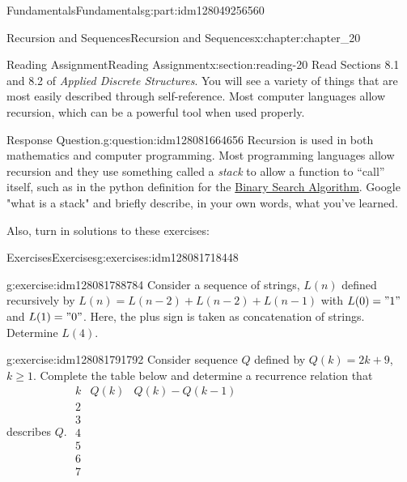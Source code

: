 \documentclass[oneside,10pt,]{book}
\numberwithin{equation}{section}
\begin{document}
\begin{partptx}{Fundamentals}{}{Fundamentals}{}{}{g:part:idm128049256560}
\begin{chapterptx}{Recursion and Sequences}{}{Recursion and Sequences}{}{}{x:chapter:chapter_20}
\typeout{************************************************}
%
\begin{sectionptx}{Reading Assignment}{}{Reading Assignment}{}{}{x:section:reading-20}
Read  Sections 8.1 and 8.2 of \emph{Applied Discrete Structures}.  You will see a variety of things that are most easily described through self-reference.  Most computer languages allow recursion, which can be a powerful tool when used properly.%
\begin{question}{Response Question.}{g:question:idm128081664656}%
Recursion is used in both mathematics and computer programming. Most programming languages allow recursion and they use something called a \emph{stack} to allow a function to ``call'' itself, such as in the python definition for the \hyperref[x:section:s-bsa]{Binary Search Algorithm}.  Google "what is a stack" and briefly describe, in your own words, what you've learned.%
\end{question}
Also, turn in solutions to these exercises:%
%
%
\typeout{************************************************}
\typeout{************************************************}
%
\begin{exercises-subsection}{Exercises}{}{Exercises}{}{}{g:exercises:idm128081718448}
\par\medskip\noindent%
%
\begin{exercisegroup}
\begin{divisionexerciseeg}{1}{}{}{g:exercise:idm128081788784}%
Consider a sequence of strings, \(L(n)\) defined recursively by \(L(n)=L(n-2)+L(n-2)+L(n-1)\) with \(L(0)="1"\) and \(L(1)="0"\). Here, the plus sign is taken as concatenation of strings.  Determine \(L(4)\).%
\end{divisionexerciseeg}%
\begin{divisionexerciseeg}{2}{}{}{g:exercise:idm128081791792}%
Consider sequence \(Q\) defined by \(Q(k) = 2k + 9\), \(k \geq  1\). Complete the table below and determine a recurrence relation that describes \(Q\). \(\begin{array}{c|c|c}
k & Q(k)  & Q(k)-Q(k-1) \\
\hline
2 &   &   \\
3 &   &   \\
4 & \text{  } &   \\
5 &   &   \\
6 &   &   \\
7 &   &   \\
\end{array}\)%

\end{divisionexerciseeg}
\end{exercisegroup}
\end{exercises-subsection}
\end{sectionptx}
\end{chapterptx}
\end{partptx}
\end{document}
